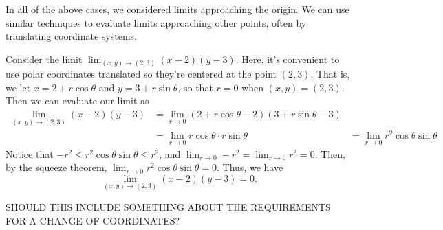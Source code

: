 \documentclass{ximera}
\begin{document}
In all of the above cases, we considered limits approaching the origin. We can use similar techniques to evaluate limits approaching other points, often by translating coordinate systems.

\begin{example}
Consider the limit $\lim_{(x,y)\rightarrow(2,3)} (x-2)(y-3)$. Here, it's convenient to use polar coordinates translated so they're centered at the point $(2,3)$. That is, we let $x = 2+r\cos\theta $ and $y=3+r\sin\theta$, so that $r=0$ when $(x,y)=(2,3)$. Then we can evaluate our limit as
\begin{align*}
\lim_{(x,y)\rightarrow(2,3)} (x-2)(y-3) &= \lim_{r\rightarrow 0}(2+r\cos\theta-2)(3+r\sin\theta -3)\\
&=\lim_{r\rightarrow 0}r\cos\theta\cdot r\sin\theta
&= \lim_{r\rightarrow 0}r^2\cos\theta\sin\theta
\end{align*}
Notice that $-r^2\leq r^2\cos\theta\sin\theta\leq r^2$, and $\lim_{r\rightarrow 0}-r^2 = \lim_{r\rightarrow 0}r^2 = 0$. Then, by the squeeze theorem, $\lim_{r\rightarrow 0} r^2\cos\theta\sin\theta =0$. Thus, we have
\[
\lim_{(x,y)\rightarrow(2,3)} (x-2)(y-3) = 0.
\]
\end{example}

SHOULD THIS INCLUDE SOMETHING ABOUT THE REQUIREMENTS FOR A CHANGE OF COORDINATES?
\end{document}
